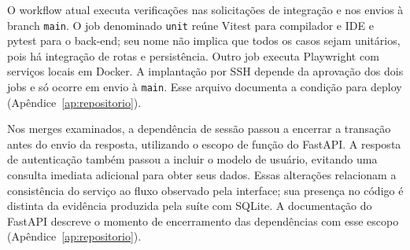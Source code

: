 O workflow atual executa verificações nas solicitações de integração e nos envios à branch \texttt{main}. O job denominado \texttt{unit} reúne Vitest para compilador e IDE e pytest para o back-end; seu nome não implica que todos os casos sejam unitários, pois há integração de rotas e persistência. Outro job executa Playwright com serviços locais em Docker. A implantação por SSH depende da aprovação dos dois jobs e só ocorre em envio à \texttt{main}. Esse arquivo documenta a condição para deploy (Apêndice~\ref{ap:repositorio}).

Nos merges examinados, a dependência de sessão passou a encerrar a transação antes do envio da resposta, utilizando o escopo de função do FastAPI. A resposta de autenticação também passou a incluir o modelo de usuário, evitando uma consulta imediata adicional para obter seus dados. Essas alterações relacionam a consistência do serviço ao fluxo observado pela interface; sua presença no código é distinta da evidência produzida pela suíte com SQLite. A documentação do FastAPI descreve o momento de encerramento das dependências com esse escopo \cite{fastapi2026yield} (Apêndice~\ref{ap:repositorio}).
